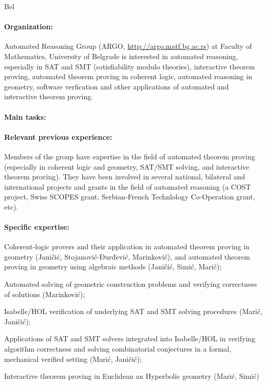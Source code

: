 \begin{sitedescription}{Bel}

\paragraph{Organization:}
Automated Reasoning Group (ARGO, \url{http://argo.matf.bg.ac.rs}) at
Faculty of Mathematics, University of Belgrade is interested in
automated reasoning, especially in SAT and SMT (satisfiability modulo
theories), interactive theorem proving, automated theorem proving in
coherent logic, automated reasoning in geometry, software verfication
and other applications of automated and interactive theorem proving.

\paragraph{Main tasks:}

\begin{compactitem}
\item{} 
\end{compactitem}


\paragraph{Relevant previous experience:}

Members of the group have expertise in the field of automated theorem
proving (especially in coherent logic and geometry, SAT/SMT solving,
and interactive theorem proving). They have been involved in several
national, bilateral and international projects and grants in the field
of automated reasoning (a COST project, Swiss SCOPES grant,
Serbian-French Technlology Co-Operation grant, etc).

\paragraph{Specific expertise:}

\begin{compactitem}
\item Coherent-logic provers and their application in automated
  theorem proving in geometry (Janičić, Stojanović-Đurđević,
  Marinković), and automated theorem proving in geometry using
  algebraic methods (Janičić, Simić, Marić);
\item Automated solving of geometric construction problems and
  verifying correctness of solutions (Marinković);
\item Isabelle/HOL verification of underlying SAT and SMT solving
 procedures (Marić, Janičić);
\item Applications of SAT and SMT solvers integrated into Isabelle/HOL
  in verifying algorithm correctness and solving combinatorial
  conjectures in a formal, mechanical verified setting (Marić,
  Janičić);
\item Interactive theorem proving in Euclidean an Hyperbolic geometry
  (Marić, Simić)
\end{compactitem}


\end{sitedescription}
